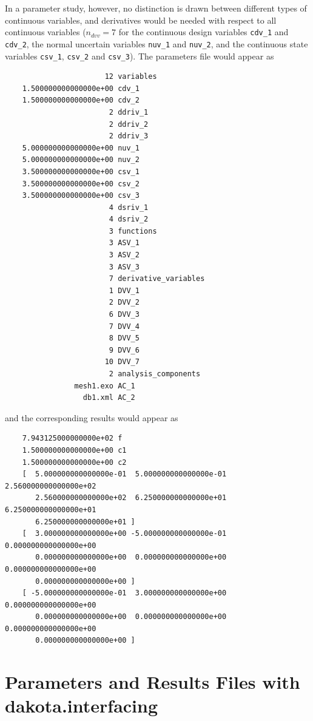 In a parameter study, however, no distinction is drawn between
different types of continuous variables, and derivatives would be
needed with respect to all continuous variables ($n_{dvv}=7$ for the
continuous design variables \texttt{cdv\_1} and \texttt{cdv\_2}, the
normal uncertain variables \texttt{nuv\_1} and \texttt{nuv\_2}, and
the continuous state variables \texttt{csv\_1}, \texttt{csv\_2} and
\texttt{csv\_3}).  The parameters file would appear as
\begin{small}
\begin{verbatim}
                       12 variables
    1.500000000000000e+00 cdv_1
    1.500000000000000e+00 cdv_2
                        2 ddriv_1
                        2 ddriv_2
                        2 ddriv_3
    5.000000000000000e+00 nuv_1
    5.000000000000000e+00 nuv_2
    3.500000000000000e+00 csv_1
    3.500000000000000e+00 csv_2
    3.500000000000000e+00 csv_3
                        4 dsriv_1
                        4 dsriv_2
                        3 functions
                        3 ASV_1
                        3 ASV_2
                        3 ASV_3
                        7 derivative_variables
                        1 DVV_1
                        2 DVV_2
                        6 DVV_3
                        7 DVV_4
                        8 DVV_5
                        9 DVV_6
                       10 DVV_7
                        2 analysis_components
                mesh1.exo AC_1
                  db1.xml AC_2
\end{verbatim}
\end{small}

and the corresponding results would appear as
\begin{small}
\begin{verbatim}
    7.943125000000000e+02 f
    1.500000000000000e+00 c1
    1.500000000000000e+00 c2
    [  5.000000000000000e-01  5.000000000000000e-01  2.560000000000000e+02
       2.560000000000000e+02  6.250000000000000e+01  6.250000000000000e+01
       6.250000000000000e+01 ]
    [  3.000000000000000e+00 -5.000000000000000e-01  0.000000000000000e+00
       0.000000000000000e+00  0.000000000000000e+00  0.000000000000000e+00
       0.000000000000000e+00 ]
    [ -5.000000000000000e-01  3.000000000000000e+00  0.000000000000000e+00
       0.000000000000000e+00  0.000000000000000e+00  0.000000000000000e+00
       0.000000000000000e+00 ]
\end{verbatim}
\end{small}

\section{Parameters and Results Files with dakota.interfacing}\label{interfaces:dakota.interfacing}

